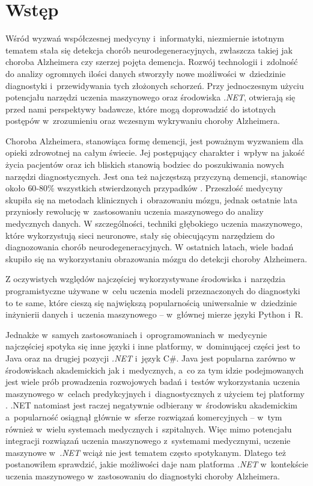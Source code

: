 \chapter*{Wstęp}

Wśród wyzwań współczesnej medycyny i~informatyki, niezmiernie istotnym tematem stała się detekcja chorób neurodegeneracyjnych, zwłaszcza takiej jak choroba Alzheimera czy szerzej pojęta demencja.
Rozwój technologii i~zdolność do analizy ogromnych ilości danych stworzyły nowe możliwości w~dziedzinie diagnostyki i~przewidywania tych złożonych schorzeń.
Przy jednoczesnym użyciu potencjału narzędzi uczenia maszynowego oraz środowiska \emph{.NET}, otwierają się przed nami perspektywy badawcze, które mogą doprowadzić do istotnych postępów w~zrozumieniu oraz wczesnym wykrywaniu choroby Alzheimera.

Choroba Alzheimera, stanowiąca formę demencji, jest poważnym wyzwaniem dla opieki zdrowotnej na całym świecie.
Jej postępujący charakter i~wpływ na jakość życia pacjentów oraz ich bliskich stanowią bodziec do poszukiwania nowych narzędzi diagnostycznych.
Jest ona też najczęstszą przyczyną demencji, stanowiąc około $60$-$80$\% wszystkich stwierdzonych przypadków \cite{what-is-alzheimers:2023}.
Przeszłość medycyny skupiła się na metodach klinicznych i~obrazowaniu mózgu, jednak ostatnie lata przyniosły rewolucję w~zastosowaniu uczenia maszynowego do analizy medycznych danych.
W szczególności, techniki głębokiego uczenia maszynowego, które wykorzystują sieci neuronowe, stały się obiecującym narzędziem do diagnozowania chorób neurodegeneracyjnych.
W ostatnich latach, wiele badań skupiło się na wykorzystaniu obrazowania mózgu do detekcji choroby Alzheimera.

Z oczywistych względów najczęściej wykorzystywane środowiska i~narzędzia programistyczne używane w~celu uczenia modeli przeznaczonych do diagnostyki to te same, które cieszą się największą popularnością uniwersalnie w~dziedzinie inżynierii danych i~uczenia maszynowego -- w~głównej mierze języki Python i~R.

Jednakże w~samych zastosowaniach i~oprogramowaniach w~medycynie najczęściej spotyka się inne języki i inne platformy, w~dominującej części jest to Java oraz na drugiej pozycji \emph{.NET} i~język C\#.
Java jest popularna zarówno w środowiskach akademickich jak i~medycznych, a~co za tym idzie podejmowanych jest wiele prób prowadzenia rozwojowych badań i~testów wykorzystania uczenia maszynowego w~celach predykcyjnych i~diagnostycznych z użyciem tej platformy \cite{soman2005classification, nithya2017predictive, gobbel2014development, godara2016evaluation}.
.NET natomiast jest raczej negatywnie odbierany w~środowisku akademickim a~popularność osiągnął głównie w~sferze rozwiązań komercyjnych -- w~tym również w~wielu systemach medycznych i~szpitalnych.
Więc mimo potencjału integracji rozwiązań uczenia maszynowego z~systemami medycznymi, uczenie maszynowe w~\emph{.NET} wciąż nie jest tematem często spotykanym.
Dlatego też postanowiłem sprawdzić, jakie możliwości daje nam platforma \emph{.NET} w~kontekście uczenia maszynowego w~zastosowaniu do diagnostyki choroby Alzheimera.

